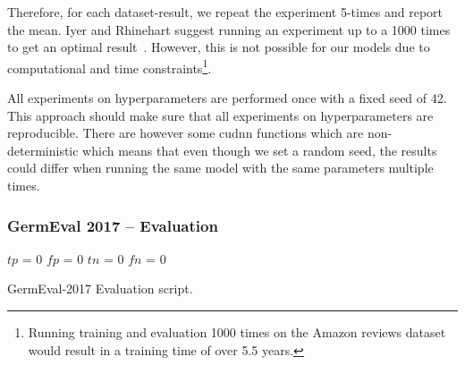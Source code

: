 Therefore, for each dataset-result, we repeat the experiment 5-times and report the mean. Iyer and Rhinehart suggest running an experiment up to a 1000 times to get an optimal result~\cite{Iyer1999}. However, this is not possible for our models due to computational and time constraints\footnote{Running training and evaluation 1000 times on the Amazon reviews dataset would result in a training time of over 5.5 years.}.
\medskip

All experiments on hyperparameters are performed once with a fixed seed of 42. This approach should make sure that all experiments on hyperparameters are reproducible. There are however some \gls{cudnn} functions which are non-deterministic which means that even though we set a random seed, the results could differ when running the same model with the same parameters multiple times.

\subsubsection*{GermEval 2017 -- Evaluation}
\label{sec:05_GermEvalEvaluation}

\begin{algorithm}[h]
    
    
    
    $tp$ = 0
    $fp$ = 0
    $tn$ = 0    
    $fn$ = 0
    
    
    
    \caption{GermEval-2017 Evaluation script.}
    \label{algo:05_germeval}
\end{algorithm}

